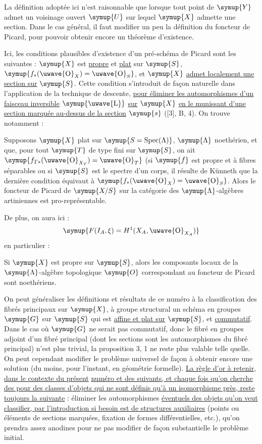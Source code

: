  La définition adoptée ici n'est raisonnable que lorsque
tout point de $\symup{Y}$ admet un voisinage
ouvert $\symup{U}$ sur lequel $\symup{X}$ admette une section. Dans le cas général, il faut
modifier un peu la définition du foncteur de Picard, pour pouvoir obtenir
encore un théorème d'existence.

Ici, les conditions plausibles d'existence d'un pré-schéma de Picard sont les
suivantes : $\symup{X}$ est \uline{propre} et \uline{plat} sur $\symup{S}$, $\symup{f_*(\text{\uwave{O}}_X)=\text{\uwave{O}}_S}$,
et $\symup{X}$ \uline{admet localement une section sur} $\symup{S}$. Cette condition s'introduit de
façon naturelle dans l'application de la technique de descente, \uline{pour éliminer
les automorphismes d'un faisceau inversible} $\symup{\text{\uwave{L}}}$ \uline{sur} $\symup{X}$ \uline{en le munissant d'une
section marquée au-dessus de la section} $\symup{s}$ ([3], B, 4). On trouve notamment :

 Supposons $\symup{X}$ plat sur
$\symup{S=\operatorname{Spec}(\Lambda)}$, $\symup{\Lambda}$ noethérien, et que, pour tout $\symup{T}$
de type fini sur $\symup{S}$, on ait $\symup{f_{T*}(\text{\uwave{O}}_{X_T})=\text{\uwave{O}}_T}$ (si $\symup{f}$ est propre et à
fibres séparables ou si $\symup{S}$ est le
spectre d'un corps, il résulte de Künneth que la dernière condition équivaut à
$\symup{f_*(\text{\uwave{O}}_X)=\text{\uwave{O}}_S}$. Alors le foncteur de Picard de $\symup{X/S}$ sur la
catégorie des $\symup{\Lambda}$-algèbres artiniennes est pro-représentable.

De plus, on aura ici :
\[
  \symup{F(I_A,\xi)=H^1(X_A,\text{\uwave{O}}_{X_A})}
\]
en particulier :

 Si $\symup{X}$ est propre sur $\symup{S}$, alors les composants locaux
de la $\symup{\Lambda}$-algèbre topologique $\symup{O}$ correspondant au foncteur de Picard
sont noethériens.

 On peut généraliser les définitions et résultats de ce
numéro à la classification des fibrés principaux sur $\symup{X}$, à groupe structural
un schéma en groupes $\symup{G}$ sur $\symup{S}$ qui est \uline{affine et plat sur} $\symup{S}$, et
\uline{commutatif}. Dans le cas où $\symup{G}$ ne serait pas commutatif, donc le fibré en
groupes adjoint d'un fibré principal (dont les sections sont les
automorphismes du fibré principal) n'est plus trivial, la proposition 3, 1 ne
reste plus valable telle quelle. On peut cependant modifier le problème
universel de façon à obtenir encore une solution (du moins, pour l'instant, en
géométrie formelle). \uline{La règle d'or à retenir, dans le contexte du présent}
\uline{numéro et des suivants, et chaque fois qu'on cherche des 
pour des classes d'objets qui ne sont définis qu'à un isomorphisme près, reste
toujours la suivante} : éliminer les automorphismes \uline{éventuels des objets qu'on
veut classifier, par l'introduction si besoin est de structures auxiliaires}
(points ou éléments de sections marquées, fixation de formes différentielles,
etc.), qu'on prendra assez anodines pour ne pas modifier de façon substantielle
le problème initial.

